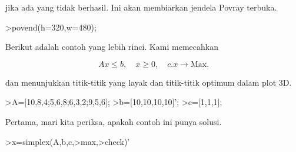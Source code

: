 \documentclass[a4paper,10pt]{article}
\begin{document}
\begin{eulernotebook}
\begin{eulercomment}
\begin{eulercomment}
\begin{eulercomment}
\begin{eulercomment}
\begin{eulercomment}
\begin{eulercomment}
\begin{eulercomment}
\begin{eulercomment}
\begin{eulercomment}
\begin{eulercomment}
\begin{eulercomment}
\begin{eulercomment}
\begin{eulercomment}
\begin{eulercomment}
\begin{eulercomment}
\begin{eulercomment}
\begin{eulercomment}
\begin{eulercomment}
\begin{eulercomment}
\begin{eulercomment}
\begin{eulercomment}
\begin{eulercomment}
\begin{eulercomment}
\begin{eulercomment}
\begin{eulercomment}
\begin{eulercomment}
\begin{eulercomment}
\begin{eulercomment}
\begin{eulercomment}
\begin{eulercomment}
\begin{eulercomment}
\begin{eulercomment}
\begin{eulercomment}
\begin{eulercomment}
\begin{eulercomment}
\begin{eulercomment}
\begin{eulercomment}
\begin{eulercomment}
\begin{eulercomment}
\begin{eulercomment}
\begin{eulercomment}
jika ada yang tidak berhasil. Ini akan membiarkan jendela Povray
terbuka.
\end{eulercomment}
\begin{eulerprompt}
>povend(h=320,w=480);
\end{eulerprompt}
\begin{eulercomment}
Berikut adalah contoh yang lebih rinci. Kami memecahkan

\end{eulercomment}
\begin{eulerformula}
\[
Ax \le b, \quad x \ge 0, \quad c.x \to \text{Max.}
\]
\end{eulerformula}
\begin{eulercomment}
dan menunjukkan titik-titik yang layak dan titik-titik optimum dalam
plot 3D.
\end{eulercomment}
\begin{eulerprompt}
>A=[10,8,4;5,6,8;6,3,2;9,5,6];
>b=[10,10,10,10]';
>c=[1,1,1];
\end{eulerprompt}
\begin{eulercomment}
Pertama, mari kita periksa, apakah contoh ini punya solusi.
\end{eulercomment}
\begin{eulerprompt}
>x=simplex(A,b,c,>max,>check)'
\end{eulerprompt}
\begin{euleroutput}
  [0,  1,  0.5]
\end{euleroutput}
\begin{eulercomment}

\end{eulercomment}
\end{eulercomment}
\end{eulercomment}
\end{eulercomment}
\end{eulercomment}
\end{eulercomment}
\end{eulercomment}
\end{eulercomment}
\end{eulercomment}
\end{eulercomment}
\end{eulercomment}
\end{eulercomment}
\end{eulercomment}
\end{eulercomment}
\end{eulercomment}
\end{eulercomment}
\end{eulercomment}
\end{eulercomment}
\end{eulercomment}
\end{eulercomment}
\end{eulercomment}
\end{eulercomment}
\end{eulercomment}
\end{eulercomment}
\end{eulercomment}
\end{eulercomment}
\end{eulercomment}
\end{eulercomment}
\end{eulercomment}
\end{eulercomment}
\end{eulercomment}
\end{eulercomment}
\end{eulercomment}
\end{eulercomment}
\end{eulercomment}
\end{eulercomment}
\end{eulercomment}
\end{eulercomment}
\end{eulercomment}
\end{eulercomment}
\end{eulercomment}
\end{eulernotebook}
\end{document}
